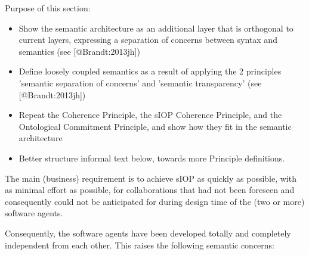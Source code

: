 \documentclass[a4paper,11pt,oneside,oldfontcommands]{memoir}
\newcounter{para}
\theoremstyle{definition}
\theoremstyle{break}		%
\numberwithin{equation}{chapter}
\numberwithin{figure}{chapter}
\begin{document}
\begin{synopsis}
Purpose of this section: 
\begin{itemize}
\item Show the semantic architecture as an additional layer that is orthogonal to current layers, expressing a separation of concerns between syntax and semantics (see [@Brandt:2013jh])
\item Define loosely coupled semantics as a result of applying the 2 principles 'semantic separation of concerns' and 'semantic transparency' (see [@Brandt:2013jh])
\item Repeat the Coherence Principle, the sIOP Coherence Principle, and the Ontological Commitment Principle, and show how they fit in the semantic architecture
\item Better structure informal text below, towards more Principle definitions.
\end{itemize}
\end{synopsis}

The main (business) requirement is to achieve sIOP as quickly as
possible, with as minimal effort as possible, for collaborations that
had not been foreseen and consequently could not be anticipated for
during design time of the (two or more) software agents.

Consequently, the software agents have been developed totally and
completely independent from each other. This raises the following
semantic concerns:
\end{document}
